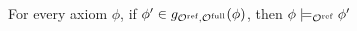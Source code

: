 \documentclass[
]{ceurart}
\begin{document}
\begin{lemma} \label{lem:weaker}
  For every \SROIQ axiom $\phi$, if $\phi' \in g_{{\mathcal{O}^\textnormal{ref}},{\mathcal{O}^\textnormal{full}}}(\phi)$, then $\phi \models_{\mathcal{O}^\textnormal{ref}} \phi'$
\end{lemma}

\end{document}
